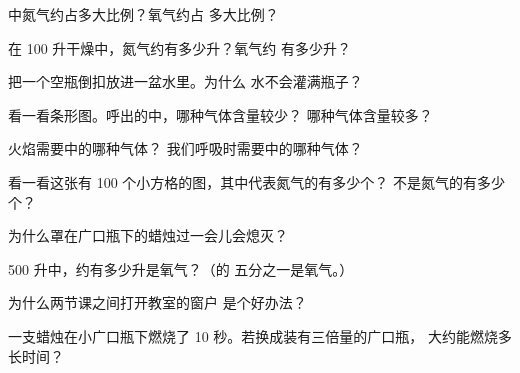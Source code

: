 \begin{exercise}[$\star$]\label{exo:g4:air-a-mixture-of-gases:2}
中氮气约占多大比例？氧气约占
多大比例？
\end{exercise}

\begin{exercise}[$\star$]\label{exo:g4:air-a-mixture-of-gases:3}
在 100 升干燥中，氮气约有多少升？氧气约
有多少升？
\end{exercise}

\begin{exercise}[$\star$]\label{exo:g4:air-a-mixture-of-gases:4}
把一个空瓶倒扣放进一盆水里。为什么
水不会灌满瓶子？
\end{exercise}

\begin{exercise}[$\star$]\label{exo:g4:air-a-mixture-of-gases:5}
看一看条形图。呼出的中，哪种气体含量较少？
哪种气体含量较多？
\end{exercise}

\begin{exercise}[$\star$]\label{exo:g4:air-a-mixture-of-gases:6}
火焰需要中的哪种气体？
我们呼吸时需要中的哪种气体？
\end{exercise}

\begin{exercise}[$\star$]\label{exo:g4:air-a-mixture-of-gases:7}
看一看这张有 100 个小方格的图，其中代表氮气的有多少个？
不是氮气的有多少个？
\end{exercise}

\begin{exercise}[$\star$]\label{exo:g4:air-a-mixture-of-gases:8}
为什么罩在广口瓶下的蜡烛过一会儿会熄灭？
\end{exercise}

\begin{exercise}[$\star$]\label{exo:g4:air-a-mixture-of-gases:9}
500 升中，约有多少升是氧气？（的
五分之一是氧气。）
\end{exercise}

\begin{exercise}[$\star\star$]\label{exo:g4:air-a-mixture-of-gases:10}
为什么两节课之间打开教室的窗户
是个好办法？
\end{exercise}

\begin{exercise}[$\star\star$]\label{exo:g4:air-a-mixture-of-gases:11}
一支蜡烛在小广口瓶下燃烧了 10 秒。若换成装有三倍量的广口瓶，
大约能燃烧多长时间？
\end{exercise}
